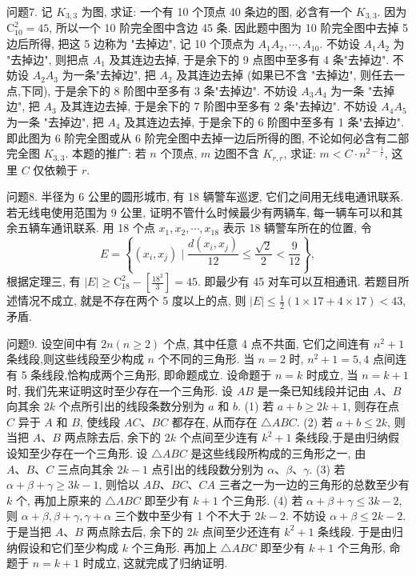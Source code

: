 问题7. 记 $K_{3,3}$ 为图, 求证: 一个有 10 个顶点 40 条边的图, 必含有一个 $K_{3,3}$.
因为 $\mathrm{C}_{10}^2=45$, 所以一个 10 阶完全图中含边 45 条.
因此题中图为 10 阶完全图中去掉 5 边后所得, 把这 5 边称为 "去掉边", 记 10 个顶点为 $A_1 A_2, \cdots, A_{10}$.
不妨设 $A_1 A_2$ 为 "去掉边", 则把点 $A_1$ 及其连边去掉, 于是余下的 9 点图中至多有 4 条"去掉边".
不妨设 $A_2 A_3$ 为一条"去掉边", 把 $A_2$ 及其连边去掉 (如果已不含 "去掉边", 则任去一点,下同), 于是余下的 8 阶图中至多有 3 条"去掉边".
不妨设 $A_3 A_4$ 为一条 "去掉边", 把 $A_3$ 及其连边去掉, 于是余下的 7 阶图中至多有 2 条"去掉边".
不妨设 $A_4 A_5$ 为一条 "去掉边", 把 $A_4$ 及其连边去掉, 于是余下的 6 阶图中至多有 1 条"去掉边".
即此图为 6 阶完全图或从 6 阶完全图中去掉一边后所得的图, 不论如何必含有二部完全图 $K_{3,3}$.
本题的推广: 若 $n$ 个顶点, $m$ 边图不含 $K_{r, r}$, 求证: $m<C \cdot n^{2-\frac{1}{r}}$, 这里 $C$ 仅依赖于 $r$.



问题8. 半径为 6 公里的圆形城市, 有 18 辆警车巡逻, 它们之间用无线电通讯联系.
若无线电使用范围为 9 公里, 证明不管什么时候最少有两辆车, 每一辆车可以和其余五辆车通讯联系.
用 18 个点 $x_1, x_2, \cdots, x_{18}$ 表示 18 辆警车所在的位置, 令
$$
E=\left\{\left(x_i, x_j\right) \mid \frac{d\left(x_i, x_j\right)}{12} \leqslant \frac{\sqrt{2}}{2}<\frac{9}{12}\right\},
$$
根据定理三, 有 $|E| \geqslant \mathrm{C}_{18}^2-\left[\frac{18^2}{3}\right]=45$. 即最少有 45 对车可以互相通讯.
若题目所述情况不成立, 就是不存在两个 5 度以上的点, 则 $|E| \leqslant \frac{1}{2}(1 \times 17+ 4 \times 17)<43$,矛盾.



问题9. 设空间中有 $2 n(n \geqslant 2)$ 个点, 其中任意 4 点不共面, 它们之间连有 $n^2+1$条线段,则这些线段至少构成 $n$ 个不同的三角形.
当 $n=2$ 时, $n^2+1=5,4$ 点间连有 5 条线段,恰构成两个三角形, 即命题成立.
设命题于 $n=k$ 时成立, 当 $n=k+1$ 时, 我们先来证明这时至少存在一个三角形.
设 $A B$ 是一条已知线段并记由 $A 、 B$ 向其余 $2 k$ 个点所引出的线段条数分别为 $a$ 和 $b$.
(1) 若 $a+b \geqslant 2 k+1$, 则存在点 $C$ 异于 $A$ 和 $B$, 使线段 $A C 、 B C$ 都存在, 从而存在 $\triangle A B C$.
(2) 若 $a+b \leqslant 2 k$, 则当把 $A 、 B$ 两点除去后, 余下的 $2 k$ 个点间至少连有 $k^2+1$ 条线段,于是由归纳假设知至少存在一个三角形.
设 $\triangle A B C$ 是这些线段所构成的三角形之一, 由 $A 、 B 、 C$ 三点向其余 $2 k-1$ 点引出的线段数分别为 $\alpha 、 \beta 、 \gamma$.
(3) 若 $\alpha+\beta+\gamma \geqslant 3 k-1$, 则恰以 $A B 、 B C 、 C A$ 三者之一为一边的三角形的总数至少有 $k$ 个, 再加上原来的 $\triangle A B C$ 即至少有 $k+1$ 个三角形.
(4) 若 $\alpha+\beta+\gamma \leqslant 3 k-2$, 则 $\alpha+\beta, \beta+\gamma, \gamma+\alpha$ 三个数中至少有 1 个不大于 $2 k-2$. 不妨设 $\alpha+\beta \leqslant 2 k-2$. 于是当把 $A 、 B$ 两点除去后, 余下的 $2 k$ 点间至少还连有 $k^2+1$ 条线段.
于是由归纳假设和它们至少构成 $k$ 个三角形.
再加上 $\triangle A B C$ 即至少有 $k+1$ 个三角形, 命题于 $n=k+1$ 时成立, 这就完成了归纳证明.



